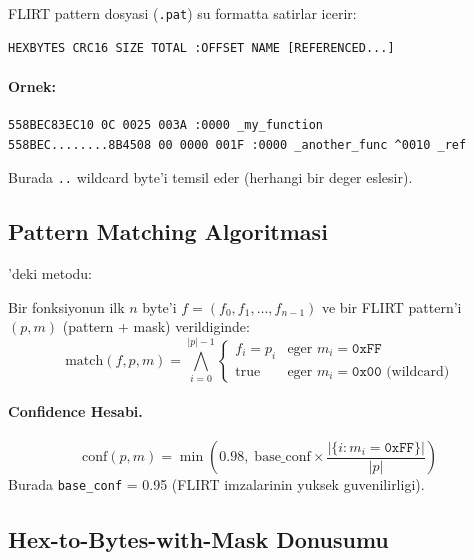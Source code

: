 FLIRT pattern dosyasi (\texttt{.pat}) su formatta satirlar icerir:

\begin{verbatim}
HEXBYTES CRC16 SIZE TOTAL :OFFSET NAME [REFERENCED...]
\end{verbatim}

\paragraph{Ornek:}
\begin{verbatim}
558BEC83EC10 0C 0025 003A :0000 _my_function
558BEC........8B4508 00 0000 001F :0000 _another_func ^0010 _ref
\end{verbatim}

Burada \texttt{..} wildcard byte'i temsil eder (herhangi bir deger eslesir).

\subsection{Pattern Matching Algoritmasi}

'deki  metodu:

\begin{tanim}
Bir fonksiyonun ilk $n$ byte'i $f = (f_0, f_1, \ldots, f_{n-1})$ ve bir FLIRT pattern'i $(p, m)$ (pattern + mask) verildiginde:
\begin{equation}
\label{eq:flirt-match}
\text{match}(f, p, m) = \bigwedge_{i=0}^{|p|-1}
\begin{cases}
f_i = p_i & \text{eger } m_i = \texttt{0xFF} \\
\text{true} & \text{eger } m_i = \texttt{0x00} \text{ (wildcard)}
\end{cases}
\end{equation}
\end{tanim}

\paragraph{Confidence Hesabi.}
\begin{equation}
\label{eq:flirt-confidence}
\text{conf}(p, m) = \min\!\left(0.98,\; \text{base\_conf} \times \frac{|\{i : m_i = \texttt{0xFF}\}|}{|p|}\right)
\end{equation}
Burada \texttt{base\_conf} = 0.95 (FLIRT imzalarinin yuksek guvenilirligi).

\subsection{Hex-to-Bytes-with-Mask Donusumu}

